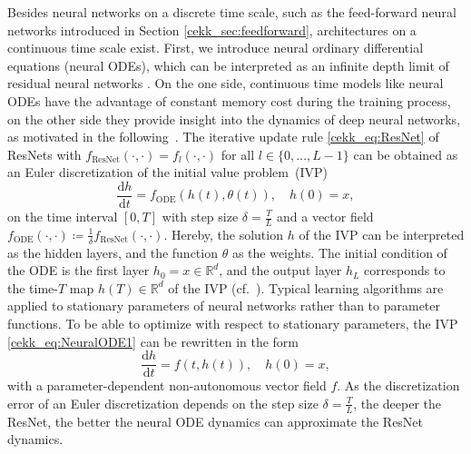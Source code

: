 \documentclass[10pt]{article}
\newcommand{\R}{{\mathbb R}}
\newcommand*{\dd}{\mathrm{d}}
\def\R{\mathbb{R}}
\begin{document}
Besides neural networks on a discrete time scale, such as the feed-forward neural networks introduced in Section \ref{cekk_sec:feedforward}, architectures on a continuous time scale exist. First, we introduce neural ordinary differential equations (neural ODEs),  which can be interpreted as an infinite depth limit of residual neural networks  \cite{Chen2018, Weinan2017, He2016, KuehnKuntz2023}. On the one side, continuous time models like neural ODEs have the advantage of  constant memory cost during the training process, on the other side they provide insight into the dynamics of deep neural networks, as motivated in the following~\cite{Chen2018}. The iterative update rule \eqref{cekk_eq:ResNet} of ResNets with $f_\text{ResNet}(\cdot,\cdot) = f_l(\cdot,\cdot)$ for all $l \in \{0,\ldots,L-1\}$ can be obtained as an Euler discretization of the initial value problem~(IVP)
\begin{equation}\label{cekk_eq:NeuralODE1}
	\frac{\dd h}{\dd t} = f_\text{ODE} (h(t),\theta(t)), \quad h(0) = x,
\end{equation}
on the time interval $[0,T]$ with step size $\delta = \frac{T}{L}$ and a vector field $f_\text{ODE}(\cdot,\cdot)\coloneqq \frac{1}{\delta}f_\text{ResNet}(\cdot,\cdot)$. Hereby, the solution $h$ of the IVP can be interpreted as the hidden layers, and the function $\theta$ as the weights. The initial condition of the ODE is the first layer $h_0 = x\in\R^d$, and the output layer $h_L$ corresponds to the time-$T$ map $h(T)\in\R^d$ of the IVP (cf.\ \cite{Guckenheimer2002}). Typical learning algorithms are applied to stationary parameters of neural networks rather than to parameter functions. To be able to optimize with respect to stationary parameters, the IVP \eqref{cekk_eq:NeuralODE1} can be rewritten in the form
\begin{equation}\label{cekk_eq:NeuralODE2}
	\frac{\dd h}{\dd t} = f(t,h(t)), \quad h(0) = x,
\end{equation}
with a parameter-dependent non-autonomous vector field $f$. As the discretization error of an Euler discretization depends on the step size $\delta = \frac{T}{L}$, the deeper the ResNet, the better the neural ODE dynamics can approximate the ResNet dynamics.
\end{document}
